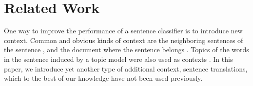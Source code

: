\documentclass{article}
\begin{document}
\begin{comment}
\begin{table}[t]
	\scriptsize
	\centering
	\begin{tabular}{|c|cccc|}
		\hline
		Rank  & MR    & CR    & SUBJ  & TREC \\
		\hline
		1     & \textcolor[rgb]{1,0,0}{\textbf{FI}} & UK & IT    & \textcolor[rgb]{0,0,1}{\textbf{FR}} \\
		2     & UK & \textcolor[rgb]{1,0,0}{\textbf{FI}} & PL    & RU \\
		3     & IT    & KO    & AR    & MN \\
		4     & \textcolor[rgb]{0,0.5,0}{\textbf{NO}}    & PL    & \textcolor[rgb]{1,0,0}{\textbf{FI}} & PL \\
		5     & AR    & \textcolor[rgb]{0,0.5,0}{\textbf{NO}}    & \textcolor[rgb]{0,0,1}{\textbf{FR}} & \textcolor[rgb]{0,0.5,0}{\textbf{NO}} \\
		6     & RU & IT    & MN    & AR \\
		7     & KO    & RU & \textcolor[rgb]{0,0.5,0}{\textbf{NO}}    & UK \\
		8     & \textcolor[rgb]{0,0,1}{\textbf{FR}} & \textcolor[rgb]{0,0,1}{\textbf{FR}} & RU & KO \\
		9     & MN    & AR    & UK & \textcolor[rgb]{1,0,0}{\textbf{FI}} \\
		10    & PL    & MN    & KO    & IT \\
		\hline
	\end{tabular}\caption{Ranking of the accuracies of a language when used as an additional context for CNN+MCFA when  on multiple datasets.}
	\label{tab:ranking}\end{table}\end{comment}

\section{Related Work}



One way to improve the performance of a sentence classifier is to introduce new context. Common and obvious kinds of context are the neighboring sentences of the sentence \cite{lin2015hierarchical}, and the document where the sentence belongs \cite{huang2012improving}. 
Topics of the words in the sentence induced by a topic model
were also used as contexts \cite{zhao2017topic}.
In this paper, we introduce yet another type of additional context, sentence translations, which to the best of our knowledge have not been used previously.
\end{document}
